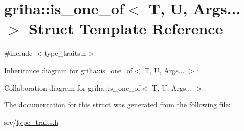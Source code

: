 \hypertarget{structgriha_1_1is__one__of_3_01_t_00_01_u_00_01_args_8_8_8_01_4}{}\section{griha\+:\+:is\+\_\+one\+\_\+of$<$ T, U, Args... $>$ Struct Template Reference}
\label{structgriha_1_1is__one__of_3_01_t_00_01_u_00_01_args_8_8_8_01_4}


{\ttfamily \#include $<$type\+\_\+traits.\+h$>$}



Inheritance diagram for griha\+:\+:is\+\_\+one\+\_\+of$<$ T, U, Args... $>$\+:


Collaboration diagram for griha\+:\+:is\+\_\+one\+\_\+of$<$ T, U, Args... $>$\+:


The documentation for this struct was generated from the following file\+:\begin{DoxyCompactItemize}
\item 
src/\hyperlink{type__traits_8h}{type\+\_\+traits.\+h}\end{DoxyCompactItemize}
